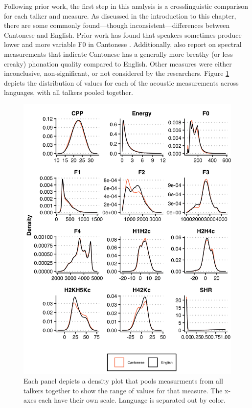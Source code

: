 Following prior work, the first step in this analysis is a crosslinguistic comparison for each talker and measure. As discussed in the introduction to this chapter, there are some commonly found---though inconsistent---differences between Cantonese and English. Prior work has found that speakers sometimes produce lower and more variable F0 in Cantonese \citep{altenberg_2006_f0,ng_2012_ltas,ng_2010_voice}. Additionally, \citet{ng_2012_ltas} also report on spectral measurements that indicate Cantonese has a generally more breathy (or less creaky) phonation quality compared to English. Other measures were either inconclusive, non-significant, or not considered by the researchers. Figure \ref{ch3:fig:allmeasures} depicts the distribution of values for each of the acoustic measurements across languages, with all talkers pooled together. 

\begin{figure}[htbp]
    \begin{center}
    \includegraphics[width=0.9\linewidth]{figures/ch3_allmeasuresdensity_5in.png} 
    \caption{Each panel depicts a density plot that pools measurments from all talkers together to show the range of values for that measure. The x-axes each have their own scale. Language is separated out by color.}
    \label{ch3:fig:allmeasures}
    \end{center}
\end{figure} 

